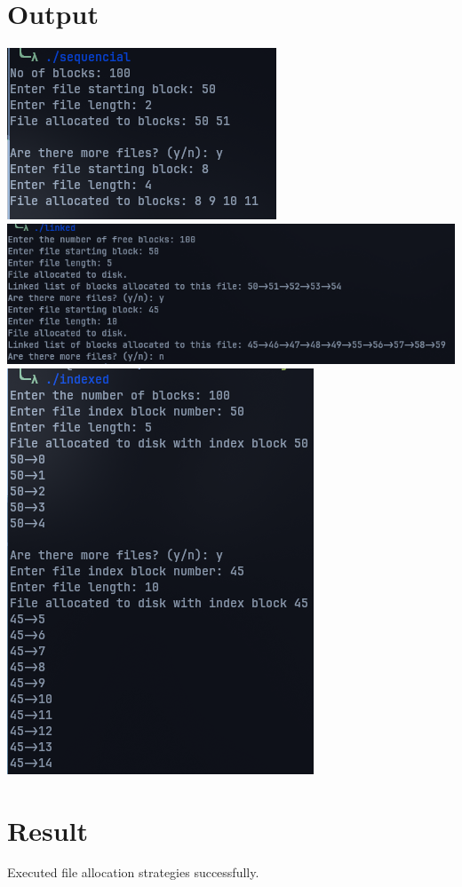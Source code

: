 \section{Output}
\includegraphics[]{Cycle_4//Outputs/sequential.png}
\newline
\includegraphics[width=0.95\linewidth]{linked1.png}
\newline
\includegraphics[]{Cycle_4//Outputs/indexed.png}




\section{Result}
Executed file allocation strategies successfully.